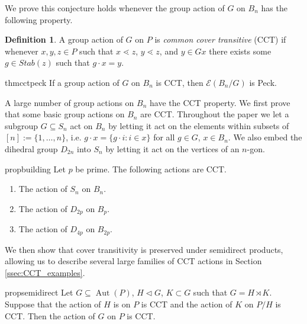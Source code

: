 \documentclass[10 pt]{amsart}
\theoremstyle{plain}
\theoremstyle{definition}
\newtheorem{defn}[thm]{Definition}
\theoremstyle{remark}
\numberwithin{equation}{section}
\begin{document}
We prove this conjecture holds whenever the group action of $G$ on $B_n$ has the following property.

\begin{defn}
\label{defn:cover_transitive}
A group action of $G$ on $P$ is \textit{common cover transitive} (CCT) if whenever $x,y,z\in P$ such that $x\lessdot z$, $y\lessdot z$, and $y\in Gx$ there exists some $g\in Stab(z)$ such that $g\cdot x = y.$
\end{defn}

\begin{restatable}{thm}{cctpeck}
\label{thm:cover_transitive_implies_Peck}
If a group action of $G$ on $B_n$ is CCT, then $\mathcal E(B_n/G)$ is Peck.
\end{restatable}

A large number of group actions on $B_n$ have the CCT property.  We first prove that some basic group actions on $B_n$ are CCT.  Throughout the paper we let a subgroup $G\subseteq S_n$ act on $B_n$ by letting it act on the elements within subsets of $[n]:= \{1,\ldots, n\}$, i.e. $g\cdot x = \{g\cdot i\colon i\in x\}$  for all $g\in G$, $x\in B_n$.  We also embed the dihedral group $D_{2n}$ into $S_n$ by letting it act on the vertices of an $n$-gon.

\begin{restatable}{prop}{building}
\label{prop:cover_transitive_building_blocks}
Let $p$ be prime.  The following actions are CCT.

\begin{enumerate}
\item The action of $S_n$ on $B_n$.
\item The action of $D_{2p}$ on $B_p$.
\item The action of $D_{4p}$ on $B_{2p}$.
\end{enumerate}
\end{restatable}

We then show that cover transitivity is preserved under semidirect products, allowing us to describe several large families of CCT actions in Section \ref{ssec:CCT_examples}.

\begin{restatable}{prop}{semidirect}
\label{prop:semidirect_product_preservation}
Let $G\subseteq \operatorname{Aut}(P)$, $H\triangleleft G$, $K\subset G$ such that $G = H\rtimes K$.  Suppose that the action of $H$ is on $P$ is CCT and the action of $K$ on $P/H$ is CCT. Then the action of $G$ on $P$ is CCT.
\end{restatable}
\end{document}
